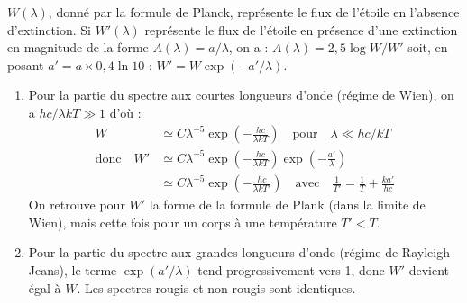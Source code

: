 \documentclass[a4paper,10pt]{report}
\begin{document}
\begin{Answer}
  $W(\lambda)$, donné par la formule de Planck, représente le flux de
  l'étoile en l'absence d'extinction.  Si $W'(\lambda)$ représente le
  flux de l'étoile en présence d'une extinction en magnitude de la
  forme $A(\lambda) = a/\lambda$, on a : $A(\lambda)= 2,5 \log W/W'$
  soit, en posant $a' = a \times 0,4 \ln 10$ : $W' = W
  \exp(-a'/\lambda)$.

  \begin{enumerate}
  \item Pour la partie du spectre aux courtes longueurs d'onde (régime
    de Wien), on a $hc/\lambda kT \gg 1$ d'où :
    \begin{align*}
      W  &\simeq C\lambda^{-5}\exp\left(-\frac{hc}{\lambda kT}\right)
      \quad\text{pour}\quad \lambda \ll hc/kT\\
      \text{donc}\quad
      W' &\simeq C\lambda^{-5}\exp\left(-\frac{hc}{\lambda kT}\right)
      \exp\left(-\frac{a'}{\lambda}\right) \\
      &\simeq C\lambda^{-5}\exp\left(-\frac{hc}{\lambda kT'}\right)
      \quad\text{avec}\quad
      \frac{1}{T'} = \frac{1}{T} + \frac{ka'}{hc}
    \end{align*}
    On retrouve pour $W'$ la forme de la formule de Plank (dans la
    limite de Wien), mais cette fois pour un corps à une température
    $T' < T$.

  \item Pour la partie du spectre aux grandes longueurs d'onde (régime
    de Rayleigh-Jeans), le terme $\exp(a'/\lambda)$ tend
    progressivement vers 1, donc $W'$ devient égal à $W$. Les spectres
    rougis et non rougis sont identiques.
  \end{enumerate}
\end{Answer}
\end{document}
